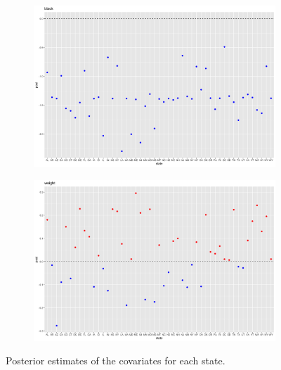 \documentclass[11pt]{article}
\begin{document}
\begin{figure}

    \centering
    \begin{subfigure}[t]{0.9\textwidth}
        \centering
        \includegraphics[width=\linewidth]{Ex5/figures/2post covariates9.png} 
    \end{subfigure}
    \hfill
    \begin{subfigure}[t]{0.9\textwidth}
        \centering
        \includegraphics[width=\linewidth]{Ex5/figures/2post covariates10.png} 
    \end{subfigure}
    \caption{Posterior estimates of the covariates for each state.}
\end{figure}
\end{document}
